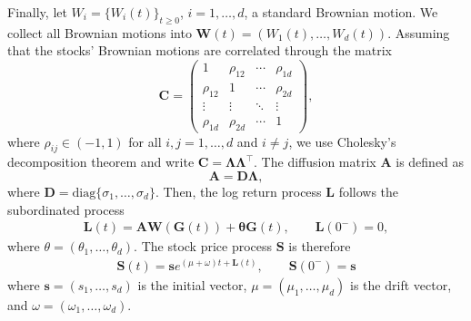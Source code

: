 Finally, let $W_i=\{W_i(t)\}_{t \geq 0}$, $i=1,\ldots, d$, a standard Brownian motion. We collect all Brownian motions into $\mathbf{W}(t)=(W_1(t), \ldots, W_d(t))$. Assuming that the stocks' Brownian motions are correlated through the matrix
\begin{equation}
    \mathbf{C} =
    \begin{pmatrix}
        1 & \rho_{12} & \cdots & \rho_{1d} \\
        \rho_{12} & 1 & \cdots & \rho_{2d} \\
        \vdots & \vdots & \ddots & \vdots \\
        \rho_{1d} & \rho_{2d} & \cdots & 1
    \end{pmatrix},
    \label{D: C-matrix}
\end{equation}
where $\rho_{ij} \in (-1,1)$ for all $i,j = 1, \ldots, d$ and $i\neq j$, we use Cholesky's decomposition theorem and write $\mathbf{C}=\mathbf{\Lambda \Lambda}^\top$. The diffusion matrix $\mathbf{A}$ is defined as
\begin{equation*}
    \mathbf A = \mathbf{D}\mathbf{\Lambda},
\end{equation*}
where $\mathbf{D} = \text{diag}\{\sigma_1, \ldots, \sigma_d\}$. Then, the log return process $\mathbf{L}$ follows the subordinated process
\begin{align}
    \mathbf{L}(t) = \mathbf{AW}(\mathbf{G}(t)) + \mathbf{\theta}\mathbf{G}(t), \qquad\mathbf{L}(0^-) = 0,
    \label{D: L-multidim}
\end{align}
where $\theta=(\theta_1, \ldots, \theta_d)$. The stock price process $\mathbf{S}$ is therefore
\begin{align}
    \mathbf{S}(t) = \mathbf{s} e^{(\mu + \omega)t + \mathbf{L}(t)}, \qquad\mathbf{S}(0^-) = \mathbf s
\end{align}
where $\mathbf{s}=(s_1, \ldots, s_d)$ is the initial vector, $\mu = (\mu_1, \ldots, \mu_d)$ is the drift vector, and $\omega=(\omega_1, \ldots, \omega_d)$. 

